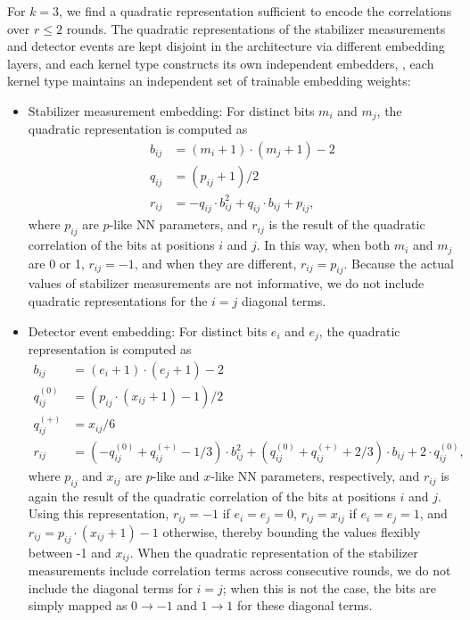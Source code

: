 For $k=3$, we find a quadratic representation sufficient to encode the correlations over $r \leq 2$ rounds.
The quadratic representations of the stabilizer measurements and detector events are kept disjoint in the architecture via different embedding layers, and each kernel type constructs its own independent embedders, \ie, each kernel type maintains an independent set of trainable embedding weights:
\begin{itemize}
\item Stabilizer measurement embedding: For distinct bits $m_i$ and $m_j$, the quadratic representation is computed as
\begin{equation}
\begin{aligned}
b_{ij}&=(m_i+1) \cdot (m_j+1) - 2 \\
q_{ij}&=(p_{ij}+1)/2 \\
r_{ij}&=-q_{ij} \cdot b^2_{ij} + q_{ij} \cdot b_{ij}+ p_{ij},
\end{aligned}
\end{equation}
where $p_{ij}$ are $p$-like NN parameters, and $r_{ij}$ is the result of the quadratic correlation of the bits at positions $i$ and $j$. In this way, when both $m_i$ and $m_j$ are 0 or 1, $r_{ij}=-1$, and when they are different, $r_{ij}=p_{ij}$. Because the actual values of stabilizer measurements are not informative, we do not include quadratic representations for the $i=j$ diagonal terms.
\item Detector event embedding: For distinct bits $e_i$ and $e_j$, the quadratic representation is computed as
\begin{equation}
\begin{aligned}
b_{ij}&=(e_i+1) \cdot (e_j+1) - 2 \\
q^{(0)}_{ij}&=\left(p_{ij}\cdot\left(x_{ij}+1 \right)-1\right)/2 \\
q^{(+)}_{ij}&=x_{ij}/6 \\
r_{ij}&=(-q^{(0)}_{ij}+q^{(+)}_{ij}-1/3) \cdot b^2_{ij} + (q^{(0)}_{ij}+q^{(+)}_{ij}+2/3) \cdot b_{ij}+ 2 \cdot q^{(0)}_{ij},
\end{aligned}
\end{equation}
where $p_{ij}$ and $x_{ij}$ are $p$-like and $x$-like NN parameters, respectively, and $r_{ij}$ is again the result of the quadratic correlation of the bits at positions $i$ and $j$. Using this representation, $r_{ij}=-1$ if $e_i=e_j=0$, $r_{ij}=x_{ij}$ if $e_i=e_j=1$, and $r_{ij}=p_{ij}\cdot\left(x_{ij}+1 \right)-1$ otherwise, thereby bounding the values flexibly between -1 and $x_{ij}$. When the quadratic representation of the stabilizer measurements include correlation terms across consecutive rounds, we do not include the diagonal terms for $i=j$; when this is not the case, the bits are simply mapped as $0\to -1$ and $1\to1$ for these diagonal terms.
\end{itemize}

